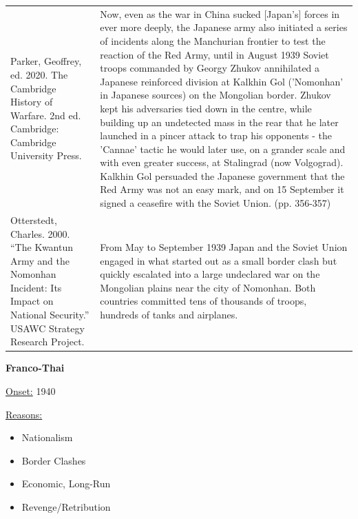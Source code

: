 {\begin{longtable}{p{}p{}}
Parker, Geoffrey, ed. 2020. The Cambridge History of Warfare. 2nd ed. Cambridge: Cambridge University Press. & Now, even as the war in China sucked [Japan's] forces in ever more deeply, the Japanese army also initiated a series of incidents along the Manchurian frontier to test the reaction of the Red Army, until in August 1939 Soviet troops commanded by Georgy Zhukov annihilated a Japanese reinforced division at Kalkhin Gol ('Nomonhan' in Japanese sources) on the Mongolian border. Zhukov kept his adversaries tied down in the centre, while building up an undetected mass in the rear that he later launched in a pincer attack to trap his opponents - the 'Cannae' tactic he would later use, on a grander scale and with even greater success, at Stalingrad (now Volgograd). Kalkhin Gol persuaded the Japanese government that the Red Army was not an easy mark, and on 15 September it signed a ceasefire with the Soviet Union. (pp. 356-357)
\\
Otterstedt, Charles. 2000. “The Kwantun Army and the Nomonhan Incident: Its Impact on National Security.” USAWC Strategy Research Project. & From May to September 1939 Japan and the Soviet Union engaged in what started out as a small border clash but quickly escalated into a large undeclared war on the Mongolian plains near the city of Nomonhan. Both countries committed tens of thousands of troops, hundreds of tanks and airplanes. 
\\
\end{longtable}}
\clearpage
         \textbf{Franco-Thai} 

          \underline{Onset:} 1940         

\underline{Reasons:}
\begin{itemize}
\item Nationalism
\item Border Clashes
\item Economic, Long-Run
\item Revenge/Retribution
\end{itemize}

